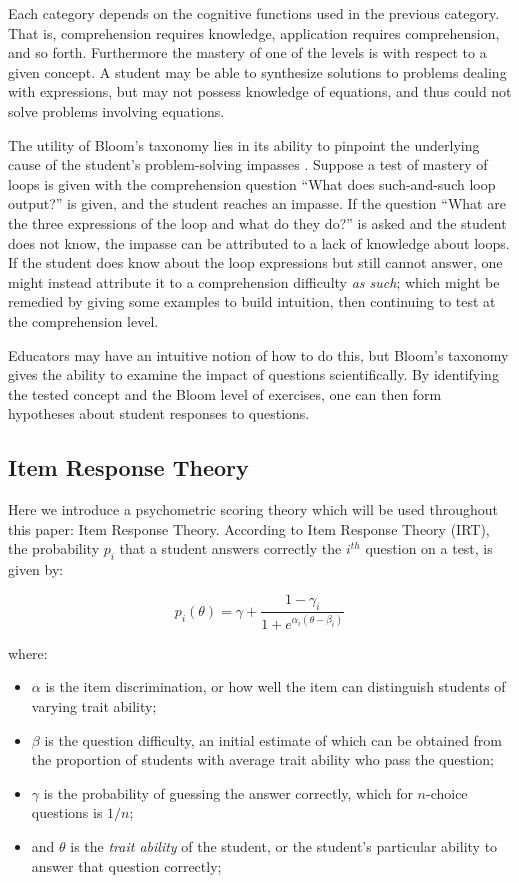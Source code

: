 \documentclass[a4paper,twocolumn]{article}
\begin{document}
Each category depends on the cognitive functions used in the previous category.
That is, comprehension requires knowledge, application requires comprehension,
and so forth.  Furthermore the mastery of one of the levels is with respect to
a given concept.  A student may be able to synthesize solutions to problems
dealing with expressions, but may not possess knowledge of equations, and thus
could not solve problems involving equations.

The utility of Bloom's taxonomy lies in its ability to pinpoint the underlying
cause of the student's problem-solving impasses \cite{shuhidan2011}.  Suppose a
test of mastery of loops is given with the comprehension question ``What does
such-and-such loop output?'' is given, and the student reaches an impasse.  If
the question ``What are the three expressions of the loop and what do they
do?'' is asked and the student does not know, the impasse can be attributed to
a lack of knowledge about loops.  If the student does know about the loop
expressions but still cannot answer, one might instead attribute it to a
comprehension difficulty \emph{as such}; which might be remedied by giving some
examples to build intuition, then continuing to test at the comprehension
level.

Educators may have an intuitive notion of how to do this, but Bloom's taxonomy
gives the ability to examine the impact of questions scientifically.  By
identifying the tested concept and the Bloom level of exercises, one can then
form hypotheses about student responses to questions.  


\subsection{Item Response Theory}

Here we introduce a psychometric scoring theory which will be used throughout
this paper: Item Response Theory.  According to Item Response Theory (IRT), the
probability $p_i$ that a student answers correctly the $i^{th}$ question on a
test, is given by:

\[
  p_i(\theta) = \gamma + \frac{1-\gamma_i}{1+e^{\alpha_i(\theta-\beta_i)}}
\]

where:

\begin{itemize} 

 \item $\alpha$ is the item discrimination, or how well the item can
 distinguish students of varying trait ability;

 \item $\beta$ is the question difficulty, an initial estimate of which can be
 obtained from the proportion of students with average trait ability who pass
 the question;

 \item $\gamma$ is the probability of guessing the answer correctly,
 which for $n$-choice questions is $1/n$;

 \item and $\theta$ is the \emph{trait ability} of the student, or the
 student's particular ability to answer that question correctly;

\end{itemize} 
\end{document}
